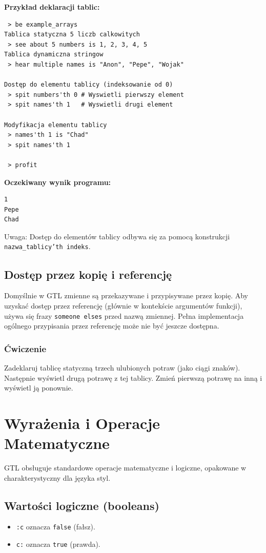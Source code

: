 \documentclass[12pt,a4paper]{article}
\begin{document}
\textbf{Przykład deklaracji tablic:}
\begin{lstlisting}
 > be example_arrays
Tablica statyczna 5 liczb calkowitych
 > see about 5 numbers is 1, 2, 3, 4, 5
Tablica dynamiczna stringow
 > hear multiple names is "Anon", "Pepe", "Wojak"

Dostęp do elementu tablicy (indeksowanie od 0)
 > spit numbers'th 0 # Wyswietli pierwszy element
 > spit names'th 1   # Wyswietli drugi element

Modyfikacja elementu tablicy
 > names'th 1 is "Chad"
 > spit names'th 1

 > profit
\end{lstlisting}
\textbf{Oczekiwany wynik programu:}
\begin{verbatim}
1
Pepe
Chad
\end{verbatim}
Uwaga: Dostęp do elementów tablicy odbywa się za pomocą konstrukcji \texttt{{nazwa\_tablicy}'th {indeks}}.

\subsection{Dostęp przez kopię i referencję}
Domyślnie w GTL zmienne są przekazywane i przypisywane przez kopię. Aby uzyskać dostęp przez referencję (głównie w kontekście argumentów funkcji), używa się frazy \texttt{someone elses} przed nazwą zmiennej. Pełna implementacja ogólnego przypisania przez referencję może nie być jeszcze dostępna.

\subsubsection*{Ćwiczenie}
Zadeklaruj tablicę statyczną trzech ulubionych potraw (jako ciągi znaków). Następnie wyświetl drugą potrawę z tej tablicy. Zmień pierwszą potrawę na inną i wyświetl ją ponownie.

\newpage
\section{Wyrażenia i Operacje Matematyczne}
\label{sec:expressions}
GTL obsługuje standardowe operacje matematyczne i logiczne, opakowane w charakterystyczny dla języka styl.

\subsection{Wartości logiczne (booleans)}
\begin{itemize}
    \item \texttt{:c} oznacza \texttt{false} (fałsz).
    \item \texttt{c:} oznacza \texttt{true} (prawda).
\end{itemize}
\end{document}

